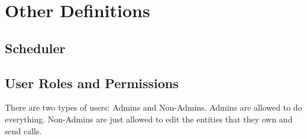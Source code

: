 \section{Other Definitions}

\subsection{Scheduler}
\label{dapnetdef:other:scheduler}

\subsection{User Roles and Permissions}
There are two types of users: Admins and Non-Admins. Admins are allowed to do everything. Non-Admins are just allowed to edit the entities that they own and send calls.
